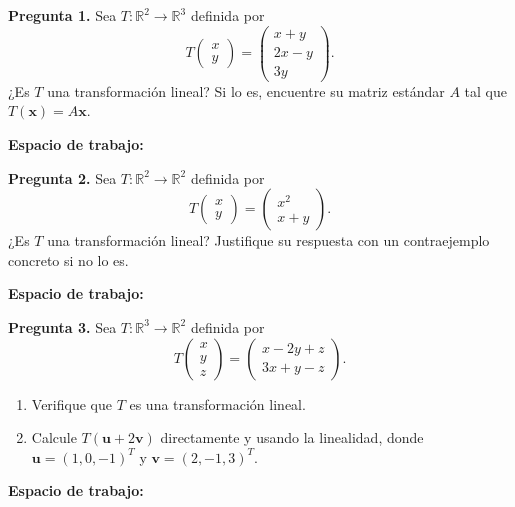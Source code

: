 \documentclass[12pt, letterpaper]{article}
\newcommand{\R}{\mathbb{R}}
\newcommand{\mat}[1]{\begin{pmatrix}#1\end{pmatrix}}
\begin{document}
\begin{cajapregunta}
\textbf{Pregunta 1.}
Sea $T:\R^2\to\R^3$ definida por
\[
  T\!\mat{x\\y} = \mat{x+y \\ 2x-y \\ 3y}.
\]
¿Es $T$ una transformación lineal? Si lo es, encuentre su matriz estándar $A$ tal que $T(\mathbf{x})=A\mathbf{x}$.
\end{cajapregunta}

\vspace{4pt}

\noindent\textbf{Espacio de trabajo:}
\vspace{5cm}

\begin{cajapregunta}
\textbf{Pregunta 2.}
Sea $T:\R^2\to\R^2$ definida por
\[
  T\!\mat{x\\y} = \mat{x^2 \\ x+y}.
\]
¿Es $T$ una transformación lineal? Justifique su respuesta con un contraejemplo concreto si no lo es.
\end{cajapregunta}

\vspace{4pt}

\noindent\textbf{Espacio de trabajo:}
\vspace{4cm}

\newpage

\begin{cajapregunta}
\textbf{Pregunta 3.}
Sea $T:\R^3\to\R^2$ definida por
\[
  T\!\mat{x\\y\\z} = \mat{x - 2y + z \\ 3x + y - z}.
\]
\begin{enumerate}[label=\alph*)]
  \item Verifique que $T$ es una transformación lineal.
  \item Calcule $T(\mathbf{u}+2\mathbf{v})$ directamente y usando la linealidad, donde
        $\mathbf{u}=(1,0,-1)^T$ y $\mathbf{v}=(2,-1,3)^T$.
\end{enumerate}
\end{cajapregunta}

\vspace{4pt}

\noindent\textbf{Espacio de trabajo:}
\vspace{6cm}
\end{document}
